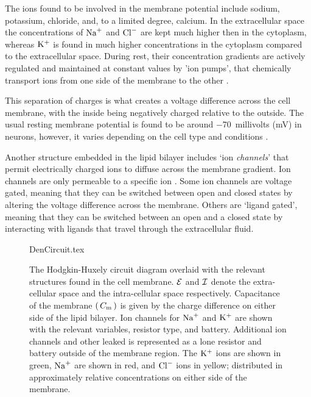 \documentclass[../../Orator]{subfiles}
\begin{document}
The ions found to be involved in the membrane potential include sodium, potassium, chloride, and, to a limited degree, calcium\footnotemark. 
In the extracellular space the concentrations of \(\mathrm{Na}^+\) and  \(\mathrm{Cl}^-\) are kept much higher then in the cytoplasm, whereas \(\mathrm{K}^+\) is found in much higher concentrations  in the cytoplasm compared to the extracellular space. During rest, their concentration gradients are actively regulated and maintained at constant values by 'ion pumps', that chemically transport ions from one side of the membrane to the other \cite{}. 

This separation of charges is what creates a voltage difference across the cell membrane, with the inside being negatively charged relative to the outside. The usual resting membrane potential is found to be around \qty{-70}{millivolts} (\unit{\milli\volt}) in neurons, however, it varies depending on the cell type and conditions \cite{}. 

Another structure embedded in the lipid bilayer includes `ion \textit{channels}' that permit electrically charged ions to diffuse across the membrane gradient. Ion channels are only permeable to a specific ion \cite{}. Some ion channels are voltage gated, meaning that they can be switched between open and closed states by altering the voltage difference across the membrane. 
Others are `ligand gated', meaning that they can be switched between an open and a closed state by interacting with ligands that travel through the extracellular fluid. 

\vspace{1em}

\begin{figure}[ht]

    \centering
    {DenCircuit.tex}
    \caption{The Hodgkin-Huxely circuit diagram overlaid with the relevant structures found in the cell membrane. \(\mathcal{E}\) and \(\mathcal{I}\) denote the extra-cellular space and the intra-cellular space respectively. Capacitance of the membrane \(\left(\,C_{\mathrm{m}}\,\right)\) is given by the charge difference on either side of the lipid bilayer. Ion channels for \(\mathrm{Na}^+\) and \(\mathrm{K}^+\) are shown with the relevant variables, resistor type, and battery. Additional ion channels and other leaked is represented as a lone resistor and battery outside of the membrane region. The \(\mathrm{K}^+\) ions are shown in green, \(\mathrm{Na}^+\) are shown in red, and \(\mathrm{Cl}^-\) ions in yellow; distributed in approximately relative concentrations on either side of the membrane. }\label{fig:MembraneCircut}
    
\end{figure}
\end{document}
